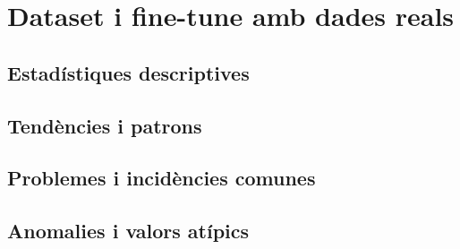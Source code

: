 \section{Dataset i fine-tune amb dades reals}

\subsection{Estadístiques descriptives}
\subsection{Tendències i patrons}
\subsection{Problemes i incidències comunes}
\subsection{Anomalies i valors atípics}

